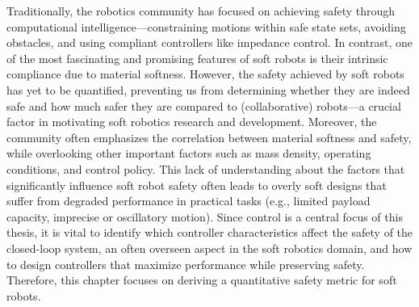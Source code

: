 \begin{foreword}
    Traditionally, the robotics community has focused on achieving safety through computational intelligence—constraining motions within safe state sets, avoiding obstacles, and using compliant controllers like impedance control. In contrast, one of the most fascinating and promising features of soft robots is their intrinsic compliance due to material softness. However, the safety achieved by soft robots has yet to be quantified, preventing us from determining whether they are indeed safe and how much safer they are compared to (collaborative) robots—a crucial factor in motivating soft robotics research and development. Moreover, the community often emphasizes the correlation between material softness and safety, while overlooking other important factors such as mass density, operating conditions, and control policy. This lack of understanding about the factors that significantly influence soft robot safety often leads to overly soft designs that suffer from degraded performance in practical tasks (e.g., limited payload capacity, imprecise or oscillatory motion). Since control is a central focus of this thesis, it is vital to identify which controller characteristics affect the safety of the closed-loop system, an often overseen aspect in the soft robotics domain, and how to design controllers that maximize performance while preserving safety. Therefore, this chapter focuses on deriving a quantitative safety metric for soft robots.
\end{foreword}

